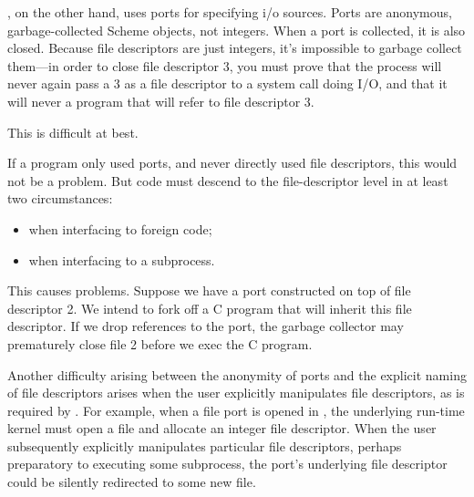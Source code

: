 {\Scheme}, on the other hand, uses ports for specifying i/o sources.  
Ports are anonymous, garbage-collected Scheme objects, not integers.  
When a port is collected, it is also closed.  Because file
descriptors are just integers, it's impossible to garbage collect them---in
order to close file descriptor 3, you must prove that the process will never
again pass a 3 as a file descriptor to a system call doing I/O, and that it
will never  a program that will refer to file descriptor 3.

This is difficult at best.

If a {\Scheme} program only used {\Scheme} ports, and never directly used
file descriptors, this would not be a problem. 
But {\Scheme} code must descend to the file-descriptor level in at least two
circumstances:
\begin{itemize}
    \item when interfacing to foreign code;
    \item when interfacing to a subprocess.
\end{itemize}
This causes problems. Suppose we have a {\Scheme} port constructed
on top of file descriptor 2. We intend to fork off a C program that
will inherit this file descriptor. If we drop references to the port,
the garbage collector may prematurely close file 2 before we exec
the C program. 

Another difficulty arising between the anonymity of ports
and the explicit naming of file descriptors arises when the
user explicitly manipulates file descriptors, as is required by
{\Unix}.
For example, when a file port is opened in {\Scheme}, the underlying run-time
{\Scheme} kernel must open a file and allocate an integer file descriptor.
When the user subsequently explicitly manipulates particular file descriptors,
perhaps preparatory to executing some {\Unix} subprocess, the port's 
underlying file descriptor could be silently redirected to some new file.

